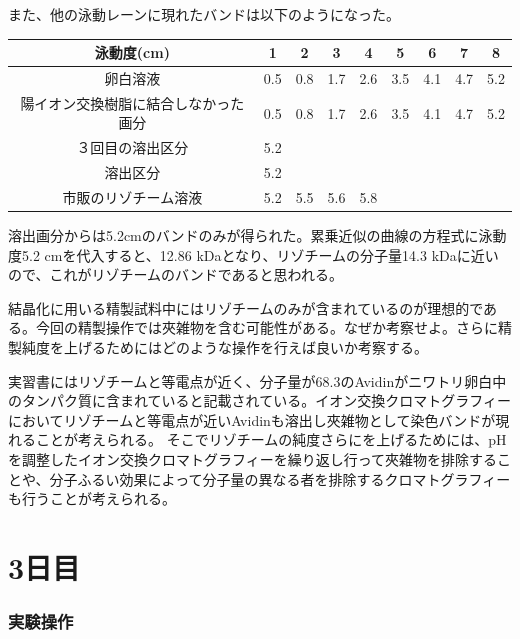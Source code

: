 \documentclass[a4paper,papersize,dvipdfmx]{jsarticle}
\begin{document}
また、他の泳動レーンに現れたバンドは以下のようになった。

\begin{table}[H]
\begin{center}
\begin{tabular}{|c|c|c|c|c|c|c|c|c|}
\hline
泳動度(cm)            & 1   & 2   & 3   & 4   & 5   & 6   & 7   & 8   \\ \hline
卵白溶液               & 0.5 & 0.8 & 1.7 & 2.6 & 3.5 & 4.1 & 4.7 & 5.2 \\ \hline
陽イオン交換樹脂に結合しなかった画分 & 0.5 & 0.8 & 1.7 & 2.6 & 3.5 & 4.1 & 4.7 & 5.2 \\ \hline
３回目の溶出区分           & 5.2 &     &     &     &     &     &     &     \\ \hline
溶出区分               & 5.2 &     &     &     &     &     &     &     \\ \hline
市販のリゾチーム溶液         & 5.2 & 5.5 & 5.6 & 5.8 &     &     &     &     \\ \hline
\end{tabular}
\end{center}
\end{table}

溶出画分からは5.2cmのバンドのみが得られた。累乗近似の曲線の方程式に泳動度5.2 cmを代入すると、12.86 kDaとなり、リゾチームの分子量14.3 kDaに近いので、これがリゾチームのバンドであると思われる。


\begin{tcolorbox}[colback=white,colbacktitle=black,coltitle=white,title={(2)}]
結晶化に用いる精製試料中にはリゾチームのみが含まれているのが理想的である。今回の精製操作では夾雑物を含む可能性がある。なぜか考察せよ。さらに精製純度を上げるためにはどのような操作を行えば良いか考察する。
\end{tcolorbox}

実習書にはリゾチームと等電点が近く、分子量が68.3のAvidinがニワトリ卵白中のタンパク質に含まれていると記載されている。イオン交換クロマトグラフィーにおいてリゾチームと等電点が近いAvidinも溶出し夾雑物として染色バンドが現れることが考えられる。
そこでリゾチームの純度さらにを上げるためには、pHを調整したイオン交換クロマトグラフィーを繰り返し行って夾雑物を排除することや、分子ふるい効果によって分子量の異なる者を排除するクロマトグラフィーも行うことが考えられる。

\part*{3日目}
\section*{実験操作}
\end{document}
